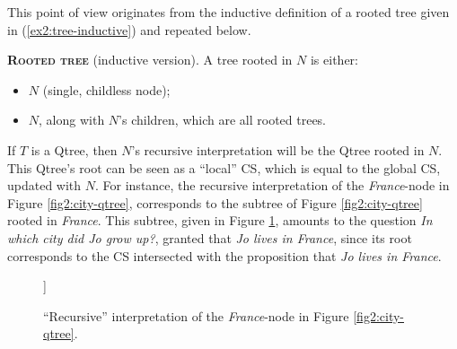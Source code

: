 This point of view originates from the inductive definition of a rooted tree given in (\ref{ex2:tree-inductive}) and repeated below.

\begin{exe}
	 {\textsc{\textbf{Rooted tree}} (inductive version). A tree rooted in $N$ is either:
		\begin{itemize}
			\item $N$ (single, childless node);
			\item $N$, along with $N$'s children, which are all rooted trees.
	\end{itemize}}
\end{exe}

If $T$ is a Qtree, then $N$'s recursive interpretation will be the Qtree rooted in $N$. This Qtree's root can be seen as a ``local'' CS, which is equal to the global CS, updated with $N$. For instance, the recursive interpretation of the \textit{France}-node in Figure \ref{fig2:city-qtree}, corresponds to the subtree of Figure \ref{fig2:city-qtree} rooted in \textit{France}. This subtree, given in Figure \ref{fig2:france-subtree}, amounts to the question \textit{In which city did Jo grow up?}, granted that \textit{Jo lives in France}, since its root corresponds to the CS intersected with the proposition that \textit{Jo lives in France}.

\begin{figure}[H]
	\centering
	\begin{forest}
		[\textcolor{blue}{France}[\textcolor{orange}{{Paris}}][\textcolor{orange}{Lyon}][\textcolor{orange}{...}]]
	\end{forest}
	\caption{``Recursive'' interpretation of the \textit{France}-node in Figure \ref{fig2:city-qtree}.}\label{fig2:france-subtree}
\end{figure}

